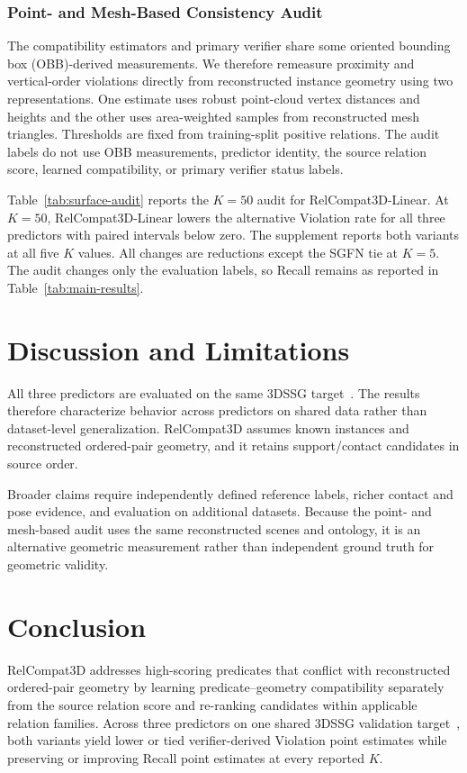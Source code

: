 \subsubsection{Point- and Mesh-Based Consistency Audit}
The compatibility estimators and primary verifier share some oriented bounding box (OBB)-derived measurements. We therefore remeasure proximity and vertical-order violations directly from reconstructed instance geometry using two representations. One estimate uses robust point-cloud vertex distances and heights and the other uses area-weighted samples from reconstructed mesh triangles. Thresholds are fixed from training-split positive relations. The audit labels do not use OBB measurements, predictor identity, the source relation score, learned compatibility, or primary verifier status labels.

Table~\ref{tab:surface-audit} reports the $K=50$ audit for RelCompat3D-Linear. At $K=50$, RelCompat3D-Linear lowers the alternative Violation rate for all three predictors with paired intervals below zero. The supplement reports both variants at all five $K$ values. All changes are reductions except the SGFN tie at $K=5$. The audit changes only the evaluation labels, so Recall remains as reported in Table~\ref{tab:main-results}.

\section{Discussion and Limitations}

All three predictors are evaluated on the same 3DSSG target~\cite{wald2020learning}. The results therefore characterize behavior across predictors on shared data rather than dataset-level generalization. RelCompat3D assumes known instances and reconstructed ordered-pair geometry, and it retains support/contact candidates in source order.
 
Broader claims require independently defined reference labels, richer contact and pose evidence, and evaluation on additional datasets. Because the point- and mesh-based audit uses the same reconstructed scenes and ontology, it is an alternative geometric measurement rather than independent ground truth for geometric validity.

\section{Conclusion}

RelCompat3D addresses high-scoring predicates that conflict with reconstructed ordered-pair geometry by learning predicate--geometry compatibility separately from the source relation score and re-ranking candidates within applicable relation families.  
Across three predictors on one shared 3DSSG validation target~\cite{wald2020learning}, both variants yield lower or tied verifier-derived Violation point estimates while preserving or improving Recall point estimates at every reported $K$.
